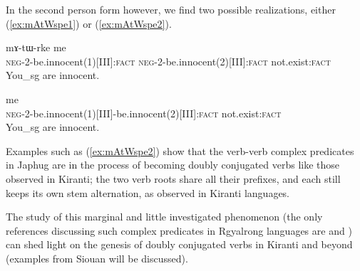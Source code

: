 \documentclass[oldfontcommands,oneside,a4paper,11pt]{article}
\newcommand{\ipa}[1]{{\phon \mbox{#1}}} %
\begin{document}
In the second person form however, we find two possible realizations, either (\ref{ex:mAtWspe1}) or (\ref{ex:mAtWspe2}). 

\begin{exe}
\ex \label{ex:mAtWspe1}
\gll \ipa{mɤ-tɯ-spe} \ipa{mɤ-tɯ-rke} \ipa{me} \\
\textsc{neg}-2-be.innocent(1)[III]:\textsc{fact} \textsc{neg}-2-be.innocent(2)[III]:\textsc{fact} not.exist:\textsc{fact} \\
\glt You_{sg} are innocent.
\end{exe} 

\begin{exe}
\ex \label{ex:mAtWspe2}
\gll \ipa{mɤ-tɯ-spe-rke} \ipa{me} \\
\textsc{neg}-2-be.innocent(1)[III]-be.innocent(2)[III]:\textsc{fact} not.exist:\textsc{fact} \\
\glt You_{sg} are innocent.
\end{exe} 

Examples such as (\ref{ex:mAtWspe2}) show that the verb-verb complex predicates in Japhug are in the process of becoming doubly conjugated verbs like those observed in Kiranti; the two verb roots share all their prefixes, and each still keeps its own stem alternation, as observed in Kiranti languages.

The study of this marginal and little investigated phenomenon (the only references discussing such complex predicates in Rgyalrong languages are \citealt{sun12complementation} and  \citealt{jacques13harmonization}) can shed light on the genesis of doubly conjugated verbs in Kiranti and beyond (examples from Siouan will be discussed). 




 
\end{document}
